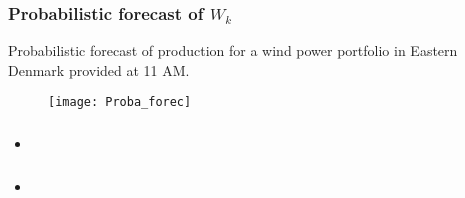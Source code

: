 \begin{frame}\frametitle{Probabilistic forecast of $W_k$}
\begin{exampleblock}{Probabilistic forecast of production for a wind power portfolio in Eastern Denmark provided at 11 AM.}
  \begin{figure}
    \centering
      \texttt{[image: Proba\_forec]}
  \end{figure}
\end{exampleblock}
\end{frame}


\begin{frame}\frametitle{}
\begin{block}{}
  \begin{itemize}
    \item
  \end{itemize}
\end{block}
\end{frame}


\begin{frame}\frametitle{}
\begin{block}{}
  \begin{itemize}
    \item
  \end{itemize}
\end{block}
\end{frame}
